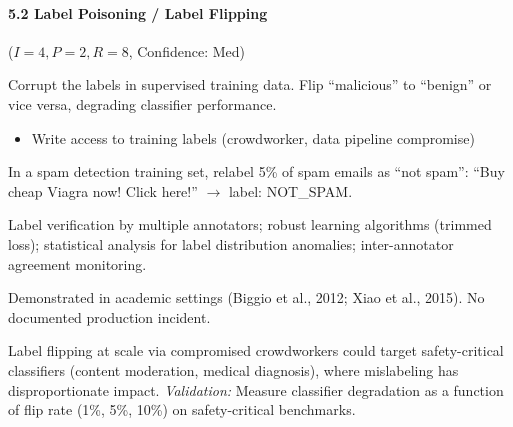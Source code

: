 \documentclass[conference]{IEEEtran}
\newenvironment{attackentry}{\begin{description}[style=unboxed,leftmargin=0cm,itemsep=1pt,parsep=1pt,topsep=2pt,font=\sffamily\small\color{accentdark}]}{\end{description}}
\begin{document}
\paragraph{5.2 Label Poisoning / Label Flipping} ($I{=}4, P{=}2, R{=}8$, Confidence: Med)
\begin{attackentry}
\item[Mechanism:] Corrupt the labels in supervised training data. Flip ``malicious'' to ``benign'' or vice versa, degrading classifier performance.
\item[Preconditions:] \begin{itemize}[nosep,leftmargin=*] \item Write access to training labels (crowdworker, data pipeline compromise) \end{itemize}
\item[Example:] In a spam detection training set, relabel 5\% of spam emails as ``not spam'': ``Buy cheap Viagra now! Click here!'' $\rightarrow$ label: NOT\_SPAM.
\item[Mitigations:] Label verification by multiple annotators; robust learning algorithms (trimmed loss); statistical analysis for label distribution anomalies; inter-annotator agreement monitoring.
\item[Evidence:] Demonstrated in academic settings (Biggio et al., 2012; Xiao et al., 2015). No documented production incident.
\item[Novel Inference (Hypothesized):] Label flipping at scale via compromised crowdworkers could target safety-critical classifiers (content moderation, medical diagnosis), where mislabeling has disproportionate impact. \textit{Validation:} Measure classifier degradation as a function of flip rate (1\%, 5\%, 10\%) on safety-critical benchmarks.
\end{attackentry}
\end{document}
